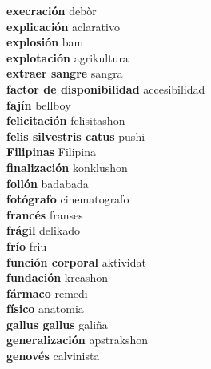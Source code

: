 \textbf{ execración  } debòr \\
\textbf{ explicación  } aclarativo \\
\textbf{ explosión  } bam \\
\textbf{ explotación  } agrikultura \\
\textbf{ extraer sangre  } sangra \\
\textbf{ factor de disponibilidad  } accesibilidad \\
\textbf{ fajín  } bellboy \\
\textbf{ felicitación  } felisitashon \\
\textbf{ felis silvestris catus  } pushi \\
\textbf{ Filipinas  } Filipina \\
\textbf{ finalización  } konklushon \\
\textbf{ follón  } badabada \\
\textbf{ fotógrafo  } cinematografo \\
\textbf{ francés  } franses \\
\textbf{ frágil  } delikado \\
\textbf{ frío  } friu \\
\textbf{ función corporal  } aktividat \\
\textbf{ fundación  } kreashon \\
\textbf{ fármaco  } remedi \\
\textbf{ físico  } anatomia \\
\textbf{ gallus gallus  } galiña \\
\textbf{ generalización  } apstrakshon \\
\textbf{ genovés  } calvinista \\
